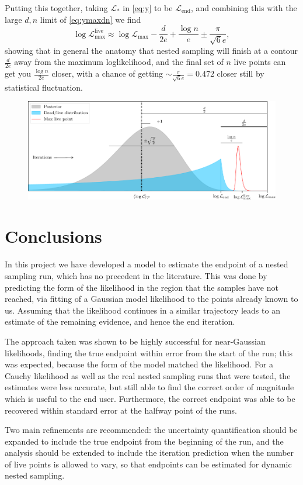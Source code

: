 \documentclass[usenatbib]{mnras} %
\begin{document}
Putting this together, taking $\mathcal{L}_*$ in \cref{eq:y} to be $\mathcal{L}_\mathrm{end}$, and combining this with the large $d,n$ limit of \cref{eq:ymaxdn} we find
\begin{equation}
    \boxed{
        \log{\mathcal{L}}_\mathrm{max}^\mathrm{live} \approx \log\mathcal{L}_\mathrm{max} - \frac{d}{2e} + \frac{\log n}{e} \pm \frac{\pi}{\sqrt{6}e}
    },
\end{equation}
showing that in general the anatomy that nested sampling will finish at a contour $\frac{d}{2e}$ away from the maximum loglikelihood, and the final set of $n$ live points can get you $\frac{\log n}{2e}$ closer, with a chance of getting $\sim\frac{\pi}{\sqrt{6}e}=0.472$ closer still by statistical fluctuation.

\begin{figure}
\begin{center}
	\includegraphics{figures/anatomy.pdf}
\end{center}
\caption{}
\label{fig:anatomy}
\end{figure}


\section{Conclusions}\label{sec:Conclusions}
In this project we have developed a model to estimate the endpoint of a nested sampling run, which has no precedent in the literature. This was done by predicting the form of the likelihood in the region that the samples have not reached, via fitting of a Gaussian model likelihood to the points already known to us. Assuming that the likelihood continues in a similar trajectory leads to an estimate of the remaining evidence, and hence the end iteration.  
\par
The approach taken was shown to be highly successful for near-Gaussian likelihoods, finding the true endpoint within error from the start of the run; this was expected, because the form of the model matched the likelihood. For a Cauchy likelihood as well as the real nested sampling runs that were tested, the estimates were less accurate, but still able to find the correct order of magnitude which is useful to the end user. Furthermore, the correct endpoint was able to be recovered within standard error at the halfway point of the runs.
\par
Two main refinements are recommended: the uncertainty quantification should be expanded to include the true endpoint from the beginning of the run, and the analysis should be extended to include the iteration prediction when the number of live points is allowed to vary, so that endpoints can be estimated for dynamic nested sampling.
\end{document}
